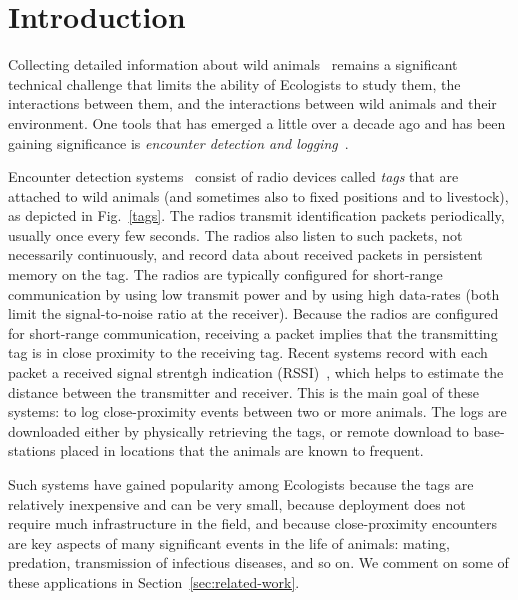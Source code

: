 \section{Introduction}

Collecting detailed information about wild animals~\cite{Prangle2006NewRadiocolars,Rutz2012AutomatedMapping} 
remains a significant technical challenge that
limits the ability of Ecologists to study them, the interactions between them, and the interactions 
between wild animals and their environment. One tools that has emerged a little over a decade ago
and has been gaining significance is 
{\em encounter detection and logging}~\cite{Tentelier2016FishNetwork,
Bohm2009WildlifeLivestock,Ripperger2016ProximitySensing}.

Encounter detection systems~\cite{Levin2015Performance,Menhill2012NovelTelemetry,dressler2016bats} 
consist of radio devices called {\em tags} that are attached to wild
animals (and sometimes also to fixed positions and to livestock), as depicted in Fig.~\ref{tags}. 
The radios transmit identification
packets periodically, usually once every few seconds. The radios also listen to such packets, not
necessarily continuously, and record data about received packets in persistent memory on the tag. The
radios are typically configured for short-range communication by using low transmit power and by 
using high data-rates (both limit the signal-to-noise ratio at the receiver). Because the radios
are configured for short-range communication, receiving a packet implies that the transmitting tag is
in close proximity to the receiving tag. Recent systems record with each packet a received signal strentgh
indication (RSSI)~\cite{Daiya2011Experimental}, which helps to estimate the distance between the transmitter and receiver.
This is the main goal of these systems: to log close-proximity
events between two or more animals. The logs are downloaded either by physically retrieving the tags,
or remote download to base-stations placed in locations that the animals are known to frequent.

Such systems have gained popularity among Ecologists because the tags are relatively inexpensive and can
be very small, because deployment does not require much infrastructure in the field, and because close-proximity
encounters are key aspects of many significant events in the life of animals: mating, predation, transmission of infectious
diseases, and so on. We comment on some of these applications in Section~\ref{sec:related-work}.

